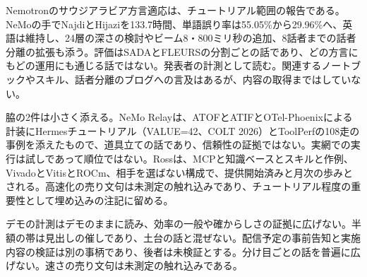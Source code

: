 Nemotronのサウジアラビア方言適応は、チュートリアル範囲の報告である\cite{nemotronasr}。NeMoの手でNajdiとHijaziを133.7時間、単語誤り率は55.05\%から29.96\%へ、英語は維持し、24層の深さの検討やビーム8・800ミリ秒の追加、8話者までの話者分離の拡張も添う。評価はSADAとFLEURSの分割ごとの話であり、どの方言にもどの運用にも通じる話ではない。発表者の計測として読む。関連するノートブックやスキル、話者分離のブログへの言及はあるが、内容の取得まではしていない。

脇の2件は小さく添える。NeMo Relayは、ATOFとATIFとOTel-Phoenixによる計装にHermesチュートリアル（VALUE=42、COLT 2026）とToolPerfの108走の事例を添えたもので、道具立ての話であり、信頼性の証拠ではない\cite{nemorelay}。実網での実行は試しであって順位ではない。Rossは、MCPと知識ベースとスキルと作例、VivadoとVitisとROCm、相手を選ばない構成で、提供開始済みと月次の歩みとされる\cite{ross}。高速化の売り文句は未測定の触れ込みであり、チュートリアル程度の重要性として埋め込みの注記に留める。

\begin{claimboundary}[資料と評価の境界]
デモの計測はデモのままに読み、効率の一般や確からしさの証拠に広げない。半額の帯は見出しの催しであり、土台の話と混ぜない。配信予定の事前告知と実施内容の検証は別の事柄であり、後者は未検証とする。分け目ごとの話を普遍に広げない。速さの売り文句は未測定の触れ込みである。
\end{claimboundary}

